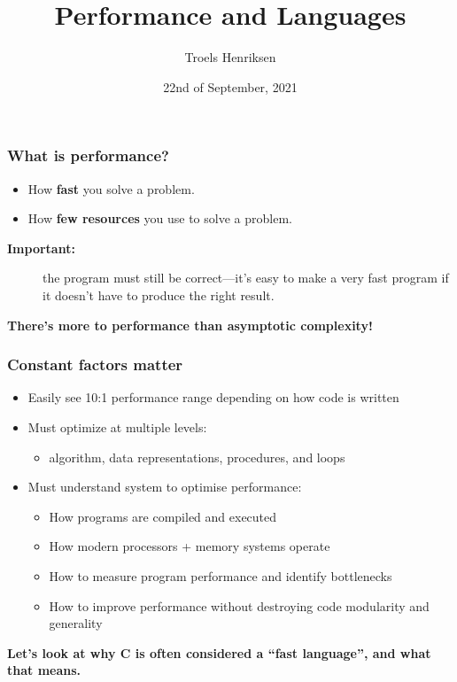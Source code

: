 \documentclass[rgb,dvipsnames,aspectratio=169,xcolor=table]{beamer}
\title{Performance and Languages}
\author{Troels Henriksen}
\date{22nd of September, 2021}
\begin{document}
\frame{\titlepage}

\begin{frame}
  \frametitle{What is performance?}

\pause

  \begin{itemize}
  \item How \textbf{fast} you solve a problem.
  \item How \textbf{few resources} you use to solve a problem.
  \end{itemize}

  \pause\bigskip

  \begin{description}
  \item[\textbf{Important:}] the program must still be correct---it's easy to
  make a very fast program if it doesn't have to produce the right
  result.
  \end{description}

  \pause\bigskip

  \begin{center}
    \textbf{There's more to performance than asymptotic complexity!}
  \end{center}
\end{frame}

\begin{frame}
  \frametitle{Constant factors matter}

  \begin{itemize}
  \item Easily see 10:1 performance range depending on how code is written
  \item Must optimize at multiple levels:
    \begin{itemize}
    \item algorithm, data representations, procedures, and loops
    \end{itemize}
  \item Must understand system to optimise performance:
    \begin{itemize}
    \item How programs are compiled and executed
    \item How modern processors + memory systems operate
    \item How to measure program performance and identify bottlenecks
    \item How to improve performance without destroying code
      modularity and generality
    \end{itemize}
  \end{itemize}

  \pause\bigskip

  \begin{center}
    \textbf{Let's look at why C is often considered a ``fast
      language'', and what that means.}
  \end{center}
\end{frame}
\end{document}
